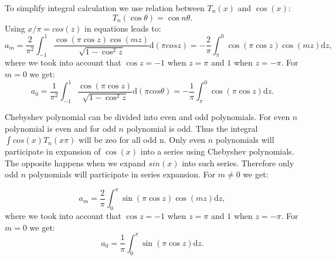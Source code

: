 \documentclass[openany, longbibliography,slovene,a4paper,12pt]{article}
\newcommand{\dif}{\mathrm{d}}
\begin{document}
To simplify integral calculation we use relation between $T_n(x)$ and $\cos(x)$:
\begin{equation}
  T_n(\cos\theta)=\cos n\theta.
\end{equation}
Using $x/\pi = cos(z)$  in equations \label{coeffm} leads to:
\begin{equation}
  a_m = \frac{2}{\pi^2} \int_{-1}^{1}\frac{\cos(\pi\cos z)\cos(mz)}{\sqrt{1-\cos^2z}} \dif (\pi cosz)=-\frac{2}{\pi} \int_{\pi}^{0}\cos(\pi\cos z)\cos(mz) \dif z, 
  \end{equation}
where we took into account that $\cos z = -1$ when $z=\pi$ and $1$ when $z=-\pi$.
  For $m=0$ we get:
  \begin{equation}
    a_0 = \frac{1}{\pi^2} \int_{-1}^{1}\frac{\cos(\pi\cos z)}{\sqrt{1-\cos^2z}} \dif (\pi cos\theta)=-\frac{1}{\pi} \int_{\pi}^{0}\cos(\pi\cos z) \dif z.
  \end{equation}

  Chebyshev polynomial can be divided into even and odd polynomials. For even
  $n$ polynomial is even and for odd $n$ polynomial is odd. Thus the integral
  $\int cos(x) T_n(x\pi)$ will be zeo for all odd n. Only even $n$ polynomials
  will participate in expansion of $\cos(x)$ into a series using Chebyshev
  polynomials.
  The opposite happens when we expand $sin(x)$ into such series. Therefore only odd
  $n$ polynomials will participate in series expansion. For $m\neq0$ we get:

\begin{equation}
  a_m = \frac{2}{\pi} \int_{0}^{\pi}\sin(\pi\cos z)\cos(mz) \dif z, 
  \end{equation}
where we took into account that $\cos z = -1$ when $z=\pi$ and $1$ when $z=-\pi$.
  For $m=0$ we get:
  \begin{equation}
    a_0 = \frac{1}{\pi} \int_{0}^{\pi}\sin(\pi\cos z) \dif z.
  \end{equation}
  
\end{document}
